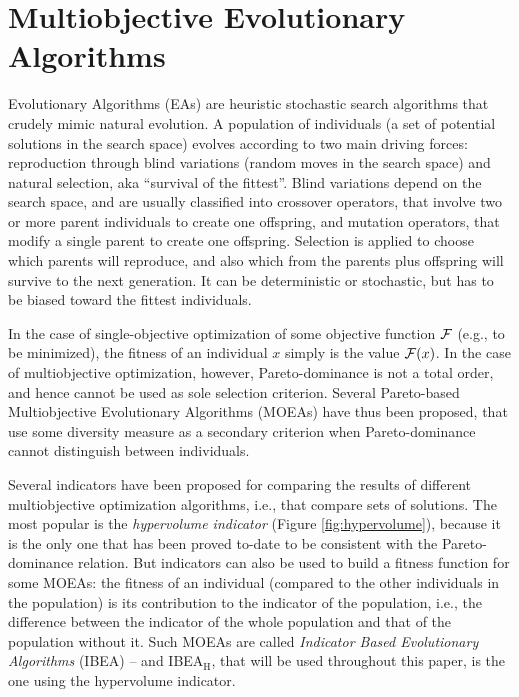 \documentclass[letterpaper]{article}
\def\IBEAH{{\sc IBEA$_{\text{H}}$}}
\begin{document}
\section{Multiobjective Evolutionary Algorithms}
\label{sec:pareto}

Evolutionary Algorithms (EAs) \cite{EibenSmith2003} are heuristic stochastic search algorithms that crudely mimic natural evolution. A population of individuals (a set of potential solutions in the search space) evolves according to two main driving forces: reproduction through blind variations (random moves in the search space) and natural selection, aka ``survival of the fittest''. Blind variations depend on the search space, and are usually classified into crossover operators, that involve two or more parent individuals to create one offspring, and mutation operators, that modify a single parent to create one offspring. Selection is applied to choose which parents will reproduce, and also which from the parents plus offspring will survive to the next generation. It can be deterministic or stochastic, but has to be biased toward the fittest individuals. 

In the case of single-objective optimization of some objective function $\cal F$ (e.g., to be minimized), the fitness of an individual $x$ simply is the value ${\cal F}(x)$. In the case of multiobjective optimization, however, Pareto-dominance is not a total order, and hence cannot be used as sole selection criterion. Several Pareto-based Multiobjective Evolutionary Algorithms (MOEAs) have thus been proposed, that use some diversity measure as a secondary criterion when Pareto-dominance cannot distinguish between individuals. 

Several indicators have been proposed for comparing the results of different multiobjective optimization algorithms, i.e., that compare sets of solutions. The most popular is the {\em hypervolume indicator} (Figure \ref{fig:hypervolume}), because it is the only one that has been proved to-date to be consistent with the Pareto-dominance relation. But indicators can also be used to build a fitness function for some MOEAs: the fitness of an individual (compared to the other individuals in the population) is its contribution to the indicator of the population, i.e., the difference between the indicator of the whole population and that of the population without it. Such MOEAs are called {\em Indicator Based Evolutionary Algorithms} (IBEA) \cite{Zitzler2004} -- and \IBEAH, that will be used throughout this paper, is the one using the hypervolume indicator.
\end{document}
